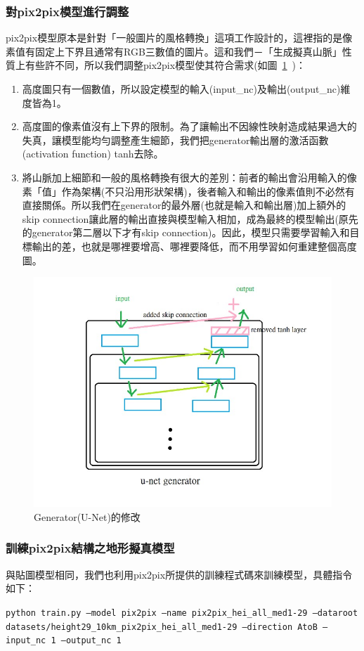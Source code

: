 \documentclass[a4paper, 12pt]{article}
\begin{document}
\subsubsection{對pix2pix模型進行調整}
pix2pix模型原本是針對「一般圖片的風格轉換」這項工作設計的，這裡指的是像素值有固定上下界且通常有RGB三數值的圖片。這和我們－「生成擬真山脈」性質上有些許不同，所以我們調整pix2pix模型使其符合需求(如圖~\ref{fig:13}~)：
\begin{enumerate}
    \item 高度圖只有一個數值，所以設定模型的輸入(input\_nc)及輸出(output\_nc)維度皆為1。
    \item 高度圖的像素值沒有上下界的限制。為了讓輸出不因線性映射造成結果過大的失真，讓模型能均勻調整產生細節，我們把generator輸出層的激活函數(activation function) tanh去除。
    \item 將山脈加上細節和一般的風格轉換有很大的差別：前者的輸出會沿用輸入的像素「值」作為架構(不只沿用形狀架構)，後者輸入和輸出的像素值則不必然有直接關係。所以我們在generator的最外層(也就是輸入和輸出層)加上額外的skip connection讓此層的輸出直接與模型輸入相加，成為最終的模型輸出(原先的generator第二層以下才有skip connection)。因此，模型只需要學習輸入和目標輸出的差，也就是哪裡要增高、哪裡要降低，而不用學習如何重建整個高度圖。
\end{enumerate}
\begin{figure}[htbp]
    \centering
    \includegraphics[width=0.6\linewidth]{fig/13.jpg}
    \caption{Generator(U-Net)的修改}
    \label{fig:13}
\end{figure}
\subsubsection{訓練pix2pix結構之地形擬真模型}
與貼圖模型相同，我們也利用pix2pix所提供的訓練程式碼來訓練模型，具體指令如下：
\begin{center}
    \texttt{\small python train.py --model pix2pix --name pix2pix\_hei\_all\_med1-29 --dataroot datasets/height29\_10km\_pix2pix\_hei\_all\_med1-29 --direction AtoB --input\_nc 1 --output\_nc 1}
\end{center}
\end{document}
